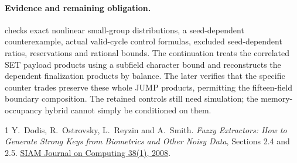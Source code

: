 \documentclass[11pt]{article}
\begin{document}
\paragraph{Evidence and remaining obligation.}  checks exact nonlinear small-group distributions, a seed-dependent counterexample, actual valid-cycle control formulas, excluded seed-dependent ratios, reservations and rational bounds. The continuation  treats the correlated SET payload products using a subfield character bound and reconstructs the dependent finalization products by balance. The later  verifies that the specific counter trades preserve these whole JUMP products, permitting the fifteen-field boundary composition. The retained controls still need simulation; the memory-occupancy hybrid cannot simply be conditioned on them.

\begin{thebibliography}{1}
 Y.~Dodis, R.~Ostrovsky, L.~Reyzin and A.~Smith. \emph{Fuzzy Extractors: How to Generate Strong Keys from Biometrics and Other Noisy Data}, Sections 2.4 and 2.5. \href{https://arxiv.org/abs/cs/0602007}{SIAM Journal on Computing 38(1), 2008}.
\end{thebibliography}
\end{document}
